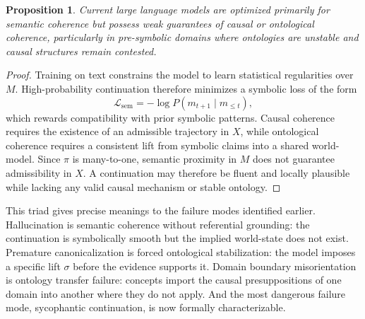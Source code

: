 \documentclass[12pt, a4paper]{article}
\newtheorem{proposition}[theorem]{Proposition}
\theoremstyle{remark}
\begin{document}
\begin{center}
\end{center}

\begin{proposition}
Current large language models are optimized primarily for semantic coherence but possess weak guarantees of causal or ontological coherence, particularly in pre-symbolic domains where ontologies are unstable and causal structures remain contested.
\end{proposition}

\begin{proof}
Training on text constrains the model to learn statistical regularities over $M$. High-probability continuation therefore minimizes a symbolic loss of the form
\[
\mathcal{L}_{\mathrm{sem}} = -\log P(m_{t+1} \mid m_{\leq t}),
\]
which rewards compatibility with prior symbolic patterns. Causal coherence requires the existence of an admissible trajectory in $X$, while ontological coherence requires a consistent lift from symbolic claims into a shared world-model. Since $\pi$ is many-to-one, semantic proximity in $M$ does not guarantee admissibility in $X$. A continuation may therefore be fluent and locally plausible while lacking any valid causal mechanism or stable ontology.
\end{proof}

This triad gives precise meanings to the failure modes identified earlier. Hallucination is semantic coherence without referential grounding: the continuation is symbolically smooth but the implied world-state does not exist. Premature canonicalization is forced ontological stabilization: the model imposes a specific lift $\sigma$ before the evidence supports it. Domain boundary misorientation is ontology transfer failure: concepts import the causal presuppositions of one domain into another where they do not apply. And the most dangerous failure mode, sycophantic continuation, is now formally characterizable.
\end{document}
